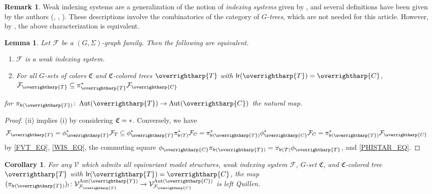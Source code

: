 \documentclass[a4paper,10pt
,draft
]{article}%
\numberwithin{equation}{section}
\numberwithin{figure}{section}
\newtheorem{lemma}[equation]{Lemma}%
\newtheorem{corollary}[equation]{Corollary}%
\theoremstyle{definition} %
\newtheorem{remark}[equation]{Remark}%
\newcommand{\vect}[1]{\text{\overrightharp{\ensuremath{#1}}}}
\DeclareMathOperator{\Aut}{Aut}%
\newcommand{\F}{\ensuremath{\mathcal F}}
\newcommand{\V}{\ensuremath{\mathcal V}}
\newcommand{\1}{\ensuremath{\mathbbm 1}}%
\begin{document}
\begin{remark}
      Weak indexing systems are a generalization of the notion of \textit{indexing systems} given by \cite[Defn. 3.22]{BH15},
      and several definitions have been given by the authors
      (\cite[Defn. 9.5]{Per18}, \cite[Defn. 4.49]{BP_geo}, \cite[Defn. 6.2]{BP_edss}).
      These descriptions involve the combinatorics of the category of \textit{$G$-trees},
      which are not needed for this article.
      However, by \cite[Remark 6.45]{BP_geo}, the above characterization is equivalent.
\end{remark}


\begin{lemma}
      Let $\F$ be a $(G,\Sigma)$-graph family. Then the following are equivalent.
      \begin{enumerate}[label = (\roman*)]
      \item $\F$ is a weak indexing system.
      \item For all $G$-sets of colors $\mathfrak C$ and $\mathfrak C$-colored trees $\vect T$ with $\mathsf{lr}(\vect T) = \vect C$, 
            $\F_{\vect T} \subseteq \pi_{\mathsf{\vect T}}^{\**}\F_{\vect C}$
      \end{enumerate}
      for $\pi_{\mathsf{lr}(\vect T)} \colon \Aut(\vect T) \to \Aut(\vect C)$ the natural map.
\end{lemma}
\begin{proof}
      (ii) implies (i) by considering $\mathfrak C = \**$.
      Conversely, we have
      \[
            \F_{\vect T} = 
            \phi_{\vect T}^{\**}\F_T \subseteq
            \phi_{\vect T}^{\**}\pi_{\mathsf{lr}(T)}^{\**} \F_C =
            \pi_{\mathsf{lr}(\vect T)}^{\**} \phi_{\vect C}^{\**} \F_C =
            \pi_{\mathsf{lr}(\vect T)}^{\**} \F_{\vect C}
      \]
      by \eqref{FVT_EQ}, \eqref{WIS_EQ},
      the commuting square $\phi_{\vect C} \pi_{\mathsf{lr}(\vect T)} = \pi_{\mathsf{lr}(T)} \phi_{\vect T}$,
      and \eqref{PHISTAR_EQ}.
\end{proof}

\begin{corollary}
      \label{PIVECTT_COR}
      For any $\V$ which admits all equivariant model structures, weak indexing system $\F$,
      $G$-set $\mathfrak C$, and $\mathfrak C$-colored tree $\vect T$ with $\mathsf{lr}(\vect T) = \vect C$,
      the map $(\pi_{\mathsf{lr}(\vect T)})_! \colon \V^{\Aut(\vect T)}_{\F_{\vect T}} \to \V^{\Aut(\vect C)}_{\F_{\vect C}}$ is left Quillen.
\end{corollary}
\end{document}
